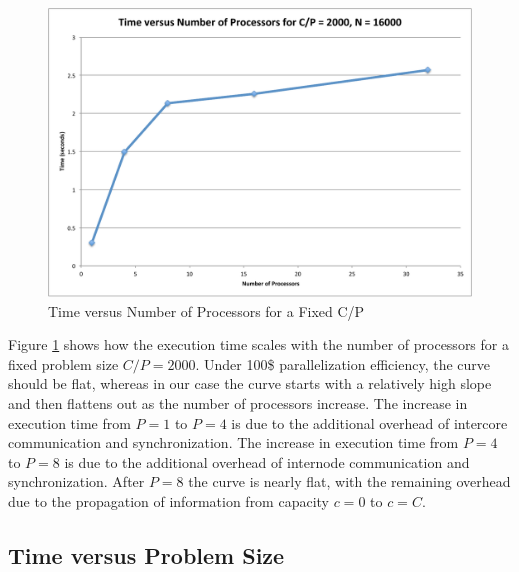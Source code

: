 \documentclass[11pt]{article} %
\begin{document}
\begin{figure}
\begin{centering}
\includegraphics[width=0.5\paperwidth]{figures/TvsP-fixed.pdf}
\caption{Time versus Number of Processors for a Fixed C/P}
\label{TvsP-fixed}
\end{centering}
\end{figure}

Figure \ref{TvsP-fixed} shows how the execution time scales with the number of processors for a fixed problem size $C/P = 2000$. Under 100\$ parallelization efficiency, the curve should be flat, whereas in our case the curve starts with a relatively high slope and then flattens out as the number of processors increase. The increase in execution time from $P = 1$ to $P = 4$ is due to the additional overhead of intercore communication and synchronization. The increase in execution time from $P = 4$ to $P = 8$ is due to the additional overhead of internode communication and synchronization. After $P = 8$ the curve is nearly flat, with the remaining overhead due to the propagation of information from capacity $c = 0$ to $c = C$.

\subsection{Time versus Problem Size}
\end{document}
